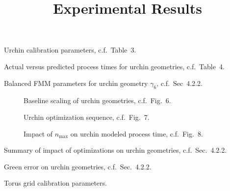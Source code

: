 \documentclass{article}
\title{Experimental Results}
\newcommand{\nmax}{n_{\textrm{max}}}
\newenvironment{resultstable}
               {
                 \begin{table}
                   \renewrobustcmd{\bfseries}{\fontseries{b}\selectfont}
               }
               {
                 \end{table}
               }
\begin{document}
\maketitle
\listoftables
\listoffigures

\begin{resultstable}
  \centering
  \caption{Urchin calibration parameters, c.f.\ Table~3.}
  
\end{resultstable}

\begin{resultstable}
  \centering
  \caption{Actual versus predicted process times for urchin geometries, c.f.\ Table~4.}
  
\end{resultstable}

\begin{resultstable}
  \centering
  \caption{Balanced FMM parameters for urchin geometry $\gamma_6$, c.f.\ Sec~4.2.2.}
  
\end{resultstable}

\begin{figure}
  \centering
  
  \caption{Baseline scaling of urchin geometries, c.f.\ Fig.~6.}
\end{figure}

\begin{figure}
  \centering
  
  \caption{Urchin optimization sequence, c.f.\ Fig.~7.}
\end{figure}

\begin{figure}
  \centering
  
  \caption{Impact of $\nmax$ on urchin modeled process time, c.f.\ Fig.~8.}
\end{figure}

\begin{resultstable}
  \centering
  \caption{Summary of impact of optimizations on urchin geometries, c.f.\ Sec.~4.2.2.}
  
\end{resultstable}

\begin{resultstable}
  \centering
  \caption{Green error on urchin geometries, c.f.\ Sec.~4.2.2.}
  
\end{resultstable}

\begin{resultstable}
  \centering
  \caption{Torus grid calibration parameters.}
  
\end{resultstable}
\end{document}
